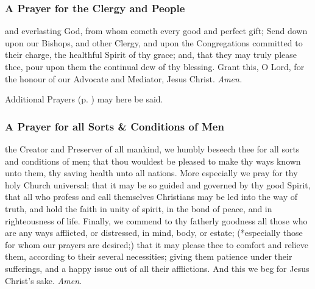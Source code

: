 \subsubsection{A Prayer for the Clergy and People}
 and everlasting God, from whom cometh every good and perfect gift; Send down upon our Bishops, and other Clergy, and upon the Congregations committed to their charge, the healthful Spirit of thy grace; and, that they may truly please thee, pour upon them the continual dew of thy blessing. Grant this, O Lord, for the honour of our Advocate and Mediator, Jesus Christ. \textit{Amen.}
\begin{rubric}
    Additional Prayers (p. \pageref{prayers}) may here be said.
\end{rubric}

\subsubsection{A Prayer for all Sorts \& Conditions of Men}
 the Creator and Preserver of all mankind, we humbly beseech thee for all sorts and conditions of men; that thou wouldest be pleased to make thy ways known unto them, thy saving health unto all nations. More especially we pray for thy holy Church universal; that it may be so guided and governed by thy good Spirit, that all who profess and call themselves Christians may be led into the way of truth, and hold the faith in unity of spirit, in the bond of peace, and in righteousness of life. Finally, we commend to thy fatherly goodness all those who are any ways afflicted, or distressed, in mind, body, or estate; (*especially those for whom our prayers are desired;) that it may please thee to comfort and relieve them, according to their several necessities; giving them patience under their sufferings, and a happy issue out of all their afflictions. And this we beg for Jesus Christ's sake. \textit{Amen.}

